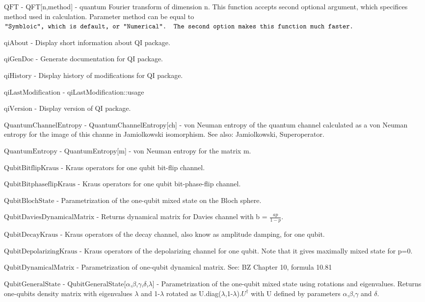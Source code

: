 \documentclass[a4paper,12pt]{article}
\begin{document}
\textbf{$ \text{QFT} $ } - QFT[n,method] - quantum Fourier transform of dimension n. This function accepts second optional argument, which specifices method used in calculation. Parameter method can be equal to $\texttt{"$ $Symbloic$\texttt{"}$, which is default, or $\texttt{"}$Numerical$\texttt{"}$. The second option makes this function much faster.} $

\textbf{$ \text{qiAbout} $ } - Display short information about QI package.$  $

\textbf{$ \text{qiGenDoc} $ } - Generate documentation for QI package.$  $

\textbf{$ \text{qiHistory} $ } - Display history of modifications for QI package.$  $

\textbf{$ \text{qiLastModification} $ } - qiLastModification$ \text{::} $usage$  $

\textbf{$ \text{qiVersion} $ } - Display version of QI package.$  $

\textbf{$ \text{QuantumChannelEntropy} $ } - QuantumChannelEntropy[ch] - von Neuman entropy of the quantum channel calculated as a von Neuman entropy for the image of this channe in Jamiolkowski isomorphism. See also: Jamiolkowski, Superoperator.$  $

\textbf{$ \text{QuantumEntropy} $ } - QuantumEntropy[m] - von Neuman entropy for the matrix m.$  $

\textbf{$ \text{QubitBitflipKraus} $ } - Kraus operators for one qubit bit-flip channel.$  $

\textbf{$ \text{QubitBitphaseflipKraus} $ } - Kraus operators for one qubit bit-phase-flip channel.$  $

\textbf{$ \text{QubitBlochState} $ } - Parametrization of the one-qubit mixed state on the Bloch sphere.$  $

\textbf{$ \text{QubitDaviesDynamicalMatrix} $ } - Returns dynamical matrix for Davies channel with b = $ \frac{a p}{1-p}. $

\textbf{$ \text{QubitDecayKraus} $ } - Kraus operators of the decay channel, also know as amplitude damping, for one qubit.$  $

\textbf{$ \text{QubitDepolarizingKraus} $ } - Kraus operators of the depolarizing channel for one qubit. Note that it gives maximally mixed state for p=0.$  $

\textbf{$ \text{QubitDynamicalMatrix} $ } - Parametrization of one-qubit dynamical matrix. See: BZ Chapter 10, formula 10.81$  $

\textbf{$ \text{QubitGeneralState} $ } - QubitGeneralState[$\alpha $,$\beta $,$\gamma $,$\delta $,$\lambda $] - Parametrization of the one-qubit mixed state using rotations and eigenvalues. Returns one-qubits density matrix with eigenvalues $\lambda $ and 1-$\lambda $ rotated as U.diag($\lambda $,1-$\lambda $).$ U^{\dagger } $ with U defined by parameters $\alpha $,$\beta $,$\gamma $ and $\delta $.$  $
\end{document}

